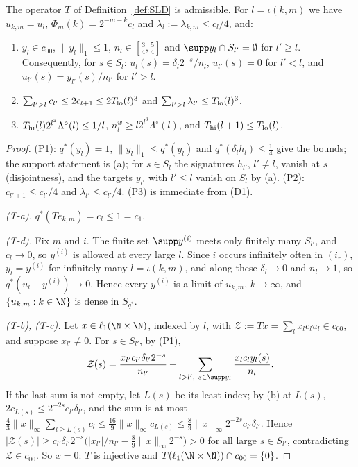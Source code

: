 \begin{theorem}\label{thm:SLD}
The operator $T$ of Definition~\ref{def:SLD} is admissible.  For
$l=\iota(k,m)$ we have $u_{k,m}=u_l$, $\Phi_m(k)=2^{-m-k}c_l$ and
$\lambda_l:=\lambda_{k,m}\le c_l/4$, and:
\begin{enumerate}
\item[(P1)] $y_l\in c_{00}$, $\|y_l\|_1\le1$, $n_l\in[\frac34,\frac54]$ and
$\supp y_l\cap S_{l'}=\emptyset$ for $l'\ge l$.  Consequently, for
$s\in S_l$: $u_l(s)=\delta_l2^{-s}/n_l$, $u_{l'}(s)=0$ for $l'<l$, and
$u_{l'}(s)=y_{l'}(s)/n_{l'}$ for $l'>l$.
\item[(P2)] $\sum_{l'>l}c_{l'}\le2c_{l+1}\le2T_{\rm lo}(l)^3$ and
$\sum_{l'>l}\lambda_{l'}\le T_{\rm lo}(l)^3$.
\item[(P3)] $T_{\rm hi}(l)2^{l^3}\Lambda^\circ(l)\le1/l$,
$n^w_l\ge l2^{l^3}\Lambda^\circ(l)$, and $T_{\rm hi}(l+1)\le T_{\rm lo}(l)$.
\end{enumerate}
\end{theorem}

\begin{proof}
(P1): $q^*(y_l)=1$, $\|y_l\|_1\le q^*(y_l)$ and $q^*(\delta_lh_l)\le\frac14$
give the bounds; the support statement is (a); for $s\in S_l$ the
signatures $h_{l'}$, $l'\ne l$, vanish at $s$ (disjointness), and the targets
$y_{l'}$ with $l'\le l$ vanish on $S_l$ by (a).  (P2): $c_{l'+1}\le
c_{l'}/4$ and $\lambda_{l'}\le c_{l'}/4$.  (P3) is immediate from (D1).

\emph{(T-a).} $q^*(Te_{k,m})=c_l\le1=c_1$.

\emph{(T-d).}  Fix $m$ and $i$.  The finite set $\supp y^{(i)}$ meets only
finitely many $S_{l'}$, and $c_l\to0$, so $y^{(i)}$ is allowed at every
large $l$.  Since $i$ occurs infinitely often in $(i_r)$, $y_l=y^{(i)}$ for
infinitely many $l=\iota(k,m)$, and along these $\delta_l\to0$ and
$n_l\to1$, so $q^*(u_l-y^{(i)})\to0$.  Hence every $y^{(i)}$ is a limit of
$u_{k,m}$, $k\to\infty$, and $\{u_{k,m}:k\in\N\}$ is dense in $S_{q^*}$.

\emph{(T-b), (T-c).}  Let $x\in\ell_1(\N\times\N)$, indexed by $l$, with
$\mathcal Z:=T x=\sum_lx_lc_lu_l\in c_{00}$, and suppose $x_{l'}\ne0$.  For
$s\in S_{l'}$, by (P1),
\[
 \mathcal Z(s)=\frac{x_{l'}c_{l'}\delta_{l'}2^{-s}}{n_{l'}}+\sum_{l>l',\
 s\in\supp y_l}\frac{x_lc_ly_l(s)}{n_l}.
\]
If the last sum is not empty, let $L(s)$ be its least index; by (b) at
$L(s)$, $2c_{L(s)}\le2^{-2s}c_{l'}\delta_{l'}$, and the sum is at most
$\frac43\|x\|_\infty\sum_{l\ge L(s)}c_l\le\frac{16}9\|x\|_\infty c_{L(s)}\le
\frac89\|x\|_\infty2^{-2s}c_{l'}\delta_{l'}$.  Hence $|\mathcal Z(s)|\ge
c_{l'}\delta_{l'}2^{-s}\big(|x_{l'}|/n_{l'}-\frac89\|x\|_\infty2^{-s}\big)>0$
for all large $s\in S_{l'}$, contradicting $\mathcal Z\in c_{00}$.  So
$x=0$: $T$ is injective and $T(\ell_1(\N\times\N))\cap c_{00}=\{0\}$.
\end{proof}

